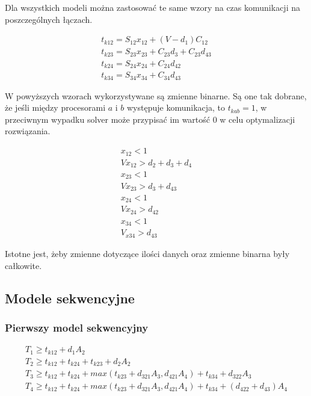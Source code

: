 Dla wszystkich modeli można zastosować te same wzory na czas komunikacji na poszczególnych łączach.

\begin{equation} \label{eq:tk}
\begin{array}{l}
t_{k12} = S_{12}x_{12} + (V - d_{1})C_{12} \\
t_{k23} = S_{23}x_{23} + C_{23}d_{3} + C_{23}d_{43} \\
t_{k24} = S_{24}x_{24} + C_{24}d_{42} \\
t_{k34} = S_{34}x_{34} + C_{34}d_{43}
\end{array}
\end{equation}

W powyższych wzorach wykorzystywane są zmienne binarne. Są one tak dobrane, że jeśli między procesorami $a$ i $b$ występuje komunikacja,
to $t_{kab} = 1$, w przeciwnym wypadku solver może przypisać im wartość $0$ w celu optymalizacji rozwiązania.

\begin{equation} \label{eq:x}
\begin{array}{l}
x_{12} < 1 \\
Vx_{12} > d_{2} + d_{3} + d_{4} \\
x_{23} < 1 \\
Vx_{23} > d_{3} + d_{43} \\
x_{24} < 1 \\
Vx_{24} > d_{42} \\
x_{34} < 1 \\
V_{x34} > d_{43}
\end{array}
\end{equation}

Istotne jest, żeby zmienne dotyczące ilości danych oraz zmienne binarna były całkowite.

\subsection{Modele sekwencyjne}

\subsubsection{Pierwszy model sekwencyjny}

\begin{equation} \label{eq:sek1}
\begin{array}{l}
T_{1} \geq t_{k12} + d_{1}A_{2} \\
T_{2} \geq t_{k12} + t_{k24} + t_{k23} + d_{2}A_{2} \\
T_{3} \geq t_{k12} + t_{k24} + max(t_{k23} + d_{321}A_{3}, d_{421}A_{4}) + t_{k34} + d_{322}A_{3} \\
T_{4} \geq t_{k12} + t_{k24} + max(t_{k23} + d_{321}A_{3}, d_{421}A_{4}) + t_{k34} + (d_{422} + d_{43})A_{4}
\end{array} 
\end{equation}

